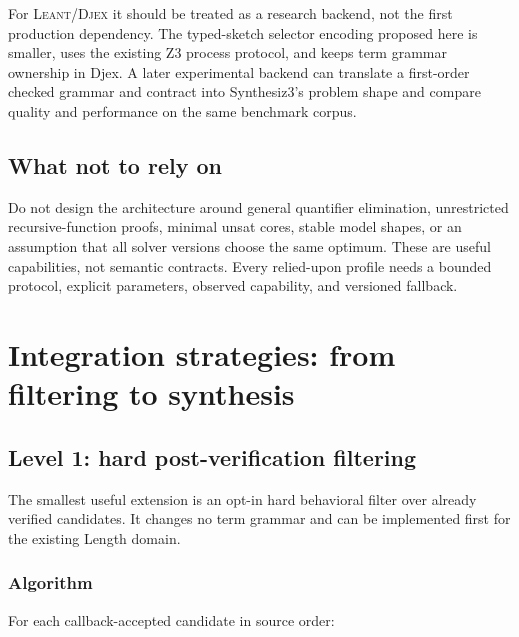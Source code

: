 \documentclass[11pt,oneside]{report}
\newcommand{\Leant}{\textsc{Leant}\xspace}
\newcommand{\Djex}{\textsc{Djex}\xspace}
\begin{document}
For \Leant/\Djex it should be treated as a research backend, not the first production dependency. The typed-sketch selector encoding proposed here is smaller, uses the existing Z3 process protocol, and keeps term grammar ownership in Djex. A later experimental backend can translate a first-order checked grammar and contract into Synthesiz3's problem shape and compare quality and performance on the same benchmark corpus.

\section{What not to rely on}

\begin{caution}
Do not design the architecture around general quantifier elimination, unrestricted recursive-function proofs, minimal unsat cores, stable model shapes, or an assumption that all solver versions choose the same optimum. These are useful capabilities, not semantic contracts. Every relied-upon profile needs a bounded protocol, explicit parameters, observed capability, and versioned fallback.
\end{caution}


\chapter{Integration strategies: from filtering to synthesis}
\label{chap:strategies}

\section{Level 1: hard post-verification filtering}
\label{sec:hard-filter}

The smallest useful extension is an opt-in hard behavioral filter over already verified candidates. It changes no term grammar and can be implemented first for the existing Length domain.

\subsection{Algorithm}

For each callback-accepted candidate in source order:
\end{document}
